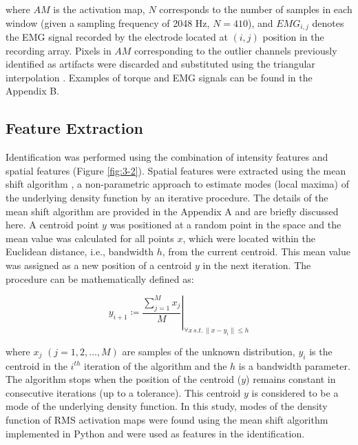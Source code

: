 where $AM$ is the activation map, $N$ corresponds to the number of samples in each window (given a sampling frequency of 2048 Hz, $N = 410$), and $EMG_{i,j}$ denotes the EMG signal recorded by the electrode located at $(i,j)$ position in the recording array. Pixels in $AM$ corresponding to the outlier channels previously identified as artifacts were discarded and substituted using the triangular interpolation \citep{Rojas-Martinez2012}. Examples of torque and EMG signals can be found in the Appendix B.


\subsection{Feature Extraction}
Identification was performed using the combination of intensity features and spatial features (Figure \ref{fig:3-2}). Spatial features were extracted using the mean shift algorithm \citep{Comaniciu2002}, a non-parametric approach to estimate modes (local maxima) of the underlying density function by an iterative procedure. The details of the mean shift algorithm are provided in the Appendix A and are briefly discussed here. A centroid point $y$ was positioned at a random point in the space and the mean value was calculated for all points $x$, which were located within the Euclidean distance, i.e., bandwidth $h$, from the current centroid. This mean value was assigned as a new position of a centroid $y$ in the next iteration. The procedure can be mathematically defined as:

\begin{equation} \label{eq:3-2}
\left. y_{i+1} \coloneqq \frac{\sum_{j=1}^{M} x_j}{M} \right\vert_{\forall x \,s.t. \,\parallel x-y_i \parallel \leq h}
\end{equation}

where $x_j$ $(j = 1, 2, …, M)$ are samples of the unknown distribution, $y_i$ is the centroid in the $i^{th}$ iteration of the algorithm and the $h$ is a bandwidth parameter. The algorithm stops when the position of the centroid ($y$) remains constant in consecutive iterations (up to a tolerance). This centroid $y$ is considered to be a mode of the underlying density function. In this study, modes of the density function of RMS activation maps were found using the mean shift algorithm implemented in Python \citep{scikit-learn} and were used as features in the identification.

